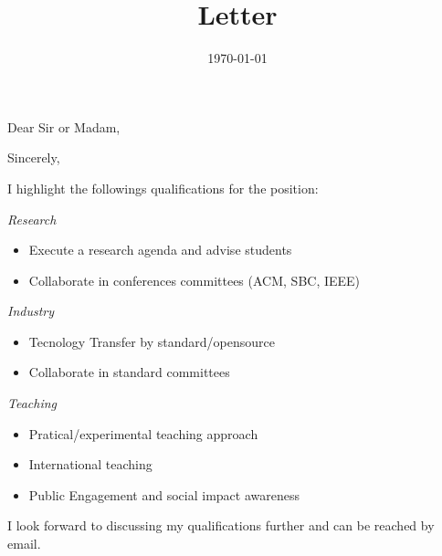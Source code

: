 \documentclass[10pt,a4paper,sans,colorlinks]{moderncv}
\title{Letter}
\begin{document}
\hfHyperrefSetupBlueLinks

\recipient{\ }{}
\opening{Dear Sir or Madam,}
\date{\today}
\closing{Sincerely,}

\makelettertitle

\justify



I highlight the followings qualifications for the position:

\textit{Research}
  \begin{itemize}[mynosep]
    \item Execute a research agenda and advise students
    \item Collaborate in conferences committees (ACM, SBC, IEEE)
  \end{itemize}

\textit{Industry}
  \begin{itemize}[mynosep]
    \item Tecnology Transfer by standard/opensource
    \item Collaborate in standard committees
  \end{itemize}

\textit{Teaching}
  \begin{itemize}[mynosep]
    \item Pratical/experimental teaching approach
    \item International teaching
    \item Public Engagement and social impact awareness
  \end{itemize}

I look forward to discussing my qualifications further and can be reached by email.

\makeletterclosing
\end{document}
